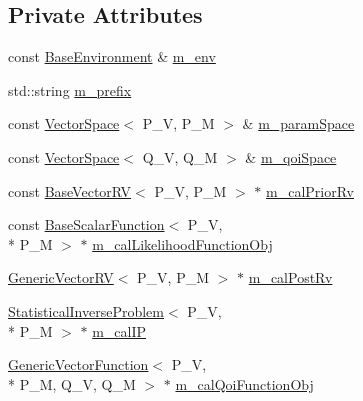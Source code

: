 \subsection*{Private Attributes}
\begin{DoxyCompactItemize}
\item 
const \hyperlink{class_q_u_e_s_o_1_1_base_environment}{Base\-Environment} \& \hyperlink{class_q_u_e_s_o_1_1_validation_cycle_a38a308718da67cac37c1290d86b93bb3}{m\-\_\-env}
\item 
std\-::string \hyperlink{class_q_u_e_s_o_1_1_validation_cycle_adcc61017a11c99f3a6189ddbf7bc76fc}{m\-\_\-prefix}
\item 
const \hyperlink{class_q_u_e_s_o_1_1_vector_space}{Vector\-Space}$<$ P\-\_\-\-V, P\-\_\-\-M $>$ \& \hyperlink{class_q_u_e_s_o_1_1_validation_cycle_a641d2e59aed41a93a787c71ec30b6e07}{m\-\_\-param\-Space}
\item 
const \hyperlink{class_q_u_e_s_o_1_1_vector_space}{Vector\-Space}$<$ Q\-\_\-\-V, Q\-\_\-\-M $>$ \& \hyperlink{class_q_u_e_s_o_1_1_validation_cycle_adccd6175c04258a6f603a92a7ae4327c}{m\-\_\-qoi\-Space}
\item 
const \hyperlink{class_q_u_e_s_o_1_1_base_vector_r_v}{Base\-Vector\-R\-V}$<$ P\-\_\-\-V, P\-\_\-\-M $>$ $\ast$ \hyperlink{class_q_u_e_s_o_1_1_validation_cycle_a9f8c93eb68908f51b728af2fffbfb4a8}{m\-\_\-cal\-Prior\-Rv}
\item 
const \hyperlink{class_q_u_e_s_o_1_1_base_scalar_function}{Base\-Scalar\-Function}$<$ P\-\_\-\-V, \\*
P\-\_\-\-M $>$ $\ast$ \hyperlink{class_q_u_e_s_o_1_1_validation_cycle_a764d9a79a615317b0749ee69c2234d40}{m\-\_\-cal\-Likelihood\-Function\-Obj}
\item 
\hyperlink{class_q_u_e_s_o_1_1_generic_vector_r_v}{Generic\-Vector\-R\-V}$<$ P\-\_\-\-V, P\-\_\-\-M $>$ $\ast$ \hyperlink{class_q_u_e_s_o_1_1_validation_cycle_a535b6447a44ac7191e12e887d1710ef0}{m\-\_\-cal\-Post\-Rv}
\item 
\hyperlink{class_q_u_e_s_o_1_1_statistical_inverse_problem}{Statistical\-Inverse\-Problem}$<$ P\-\_\-\-V, \\*
P\-\_\-\-M $>$ $\ast$ \hyperlink{class_q_u_e_s_o_1_1_validation_cycle_afa19cacc32a262840f2108ed405f0521}{m\-\_\-cal\-I\-P}
\item 
\hyperlink{class_q_u_e_s_o_1_1_generic_vector_function}{Generic\-Vector\-Function}$<$ P\-\_\-\-V, \\*
P\-\_\-\-M, Q\-\_\-\-V, Q\-\_\-\-M $>$ $\ast$ \hyperlink{class_q_u_e_s_o_1_1_validation_cycle_ab891acfabc02b5e590deee6e05e30b2c}{m\-\_\-cal\-Qoi\-Function\-Obj}

\end{DoxyCompactItemize}
